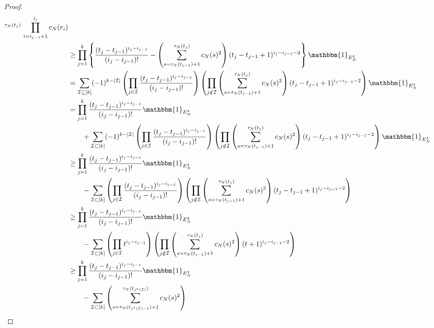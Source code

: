 \documentclass{article}
\newcommand{\1}[1]{\mathbbm{1}_{#1}}
\begin{document}
\begin{proof}
\begin{align}
        ^{\tau_N(t_j)}  \,\prod_{i=i_{j-1}+1}^{i_j} c_N(r_i) \notag\\
&\geq \prod_{j=1}^k \left\{ \frac{(t_j - t_{j-1})^{i_j - i_{j-1}}}{(i_j - i_{j-1})!}  
        - \left( \sum_{s=\tau_N(t_{j-1})+1}^{\tau_N(t_j)} c_N(s)^2 \right)
        ( t_j - t_{j-1} +1 )^{i_j - i_{j-1} -2} \right\} \1{E_N^4} \notag\\
&= \sum_{\mathcal{I} \subseteq [k]} (-1)^{k-|\mathcal{I}|} 
        \left( \prod_{j\in\mathcal{I}} \frac{(t_j - t_{j-1})^{i_j - i_{j-1}}}
        {(i_j - i_{j-1})!} \right)
        \left( \prod_{j\notin\mathcal{I}} \left( \sum_{s=\tau_N(t_{j-1})+1}
        ^{\tau_N(t_j)} c_N(s)^2 \right) ( t_j - t_{j-1} +1 )^{i_j - i_{j-1} -2} \right) 
        \1{E_N^4} \notag\\
&= \prod_{j=1}^k \frac{(t_j - t_{j-1})^{i_j - i_{j-1}}}{(i_j - i_{j-1})!} 
        \1{E_N^4} \notag\\
    &\qquad+ \sum_{\mathcal{I} \subset [k]} (-1)^{k-|\mathcal{I}|} 
        \left( \prod_{j\in\mathcal{I}} \frac{(t_j - t_{j-1})^{i_j - i_{j-1}}}
        {(i_j - i_{j-1})!} \right)
        \left( \prod_{j\notin\mathcal{I}} 
        \left( \sum_{s=\tau_N(t_{j-1})+1}^{\tau_N(t_j)} c_N(s)^2 \right) 
        ( t_j - t_{j-1} +1 )^{i_j - i_{j-1} -2} \right) \1{E_N^4} \notag\\
&\geq \prod_{j=1}^k \frac{(t_j - t_{j-1})^{i_j - i_{j-1}}}{(i_j - i_{j-1})!} 
        \1{E_N^4}  \notag\\
    &\qquad- \sum_{\mathcal{I} \subset [k]} \left( \prod_{j\in\mathcal{I}} 
        \frac{(t_j - t_{j-1})^{i_j - i_{j-1}}}{(i_j - i_{j-1})!} \right)
        \left( \prod_{j\notin\mathcal{I}} \left( \sum_{s=\tau_N(t_{j-1})+1}
        ^{\tau_N(t_j)} c_N(s)^2 \right) ( t_j - t_{j-1} +1 )^{i_j - i_{j-1} -2} \right) 
        \notag\\
&\geq \prod_{j=1}^k \frac{(t_j - t_{j-1})^{i_j - i_{j-1}}}{(i_j - i_{j-1})!} 
        \1{E_N^4} \notag\\
    &\qquad- \sum_{\mathcal{I} \subset [k]} \left( \prod_{j\in\mathcal{I}} 
        t^{i_j - i_{j-1}} \right)
        \left( \prod_{j\notin\mathcal{I}} \left( \sum_{s=\tau_N(t_{j-1})+1}
        ^{\tau_N(t_j)} c_N(s)^2 \right) ( t+1 )^{i_j - i_{j-1} -2} \right) 
        \notag\\
&\geq \prod_{j=1}^k \frac{(t_j - t_{j-1})^{i_j - i_{j-1}}}{(i_j - i_{j-1})!} 
        \1{E_N^4} \notag\\
    &\qquad- \sum_{\mathcal{I} \subset [k]} 
        \left( \sum_{s=\tau_N(t_{j^\star(\mathcal{I})-1})+1}
        ^{\tau_N(t_{j^\star(\mathcal{I})})} c_N(s)^2 \right)

\end{align}
\end{proof}
\end{document}
